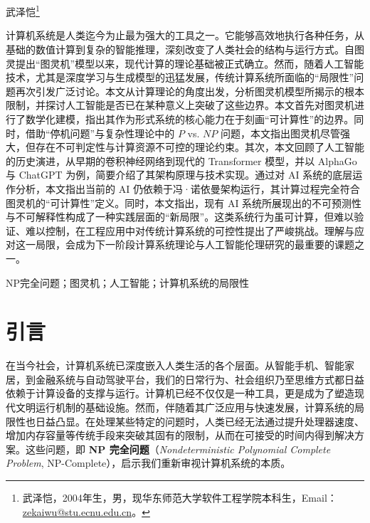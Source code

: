 \documentclass[UTF8,openany,zihao=5]{ctexbook}
\begin{document}
\setcounter{page}{1}

\begin{center}
  ~\\[1em]
  {
  \heiti{}\\
  \vspace{0.8em}
  \kaishu{}武泽恺\footnote{武泽恺，2004年生，男，现华东师范大学软件工程学院本科生，Email：\url{zekaiwu@stu.ecnu.edu.cn}。}\\
  \vspace{0.2em}
  \songti{}
  }
\end{center}

\pagestyle{plain}

\linespread{1.1}
{
  计算机系统是人类迄今为止最为强大的工具之一。它能够高效地执行各种任务，从基础的数值计算到复杂的智能推理，深刻改变了人类社会的结构与运行方式。自图灵提出“图灵机”模型以来，现代计算的理论基础被正式确立。然而，随着人工智能技术，尤其是深度学习与生成模型的迅猛发展，传统计算系统所面临的“局限性”问题再次引发广泛讨论。本文从计算理论的角度出发，分析图灵机模型所揭示的根本限制，并探讨人工智能是否已在某种意义上突破了这些边界。本文首先对图灵机进行了数学化建模，指出其作为形式系统的核心能力在于刻画“可计算性”的边界。同时，借助“停机问题”与复杂性理论中的 $P$ vs. $NP$ 问题，本文指出图灵机尽管强大，但存在不可判定性与计算资源不可控的理论约束。其次，本文回顾了人工智能的历史演进，从早期的卷积神经网络到现代的 Transformer 模型，并以 AlphaGo 与 ChatGPT 为例，简要介绍了其架构原理与技术实现。通过对 AI 系统的底层运作分析，本文指出当前的 AI 仍依赖于冯·诺依曼架构运行，其计算过程完全符合图灵机的“可计算性”定义。同时，本文指出，现有 AI 系统所展现出的不可预测性与不可解释性构成了一种实践层面的“新局限”。这类系统行为虽可计算，但难以验证、难以控制，在工程应用中对传统计算系统的可控性提出了严峻挑战。理解与应对这一局限，会成为下一阶段计算系统理论与人工智能伦理研究的最重要的课题之一。

  NP完全问题；图灵机；人工智能；计算机系统的局限性
}
\linespread{1.25}

\songti{}
\chapter{引言}

在当今社会，计算机系统已深度嵌入人类生活的各个层面。从智能手机、智能家居，到金融系统与自动驾驶平台，我们的日常行为、社会组织乃至思维方式都日益依赖于计算设备的支撑与运行。计算机已经不仅仅是一种工具，更是成为了塑造现代文明运行机制的基础设施。然而，伴随着其广泛应用与快速发展，计算系统的局限性也日益凸显。在处理某些特定的问题时，人类已经无法通过提升处理器速度、增加内存容量等传统手段来突破其固有的限制，从而在可接受的时间内得到解决方案。这些问题，即 \textbf{NP 完全问题}（\textit{Nondeterministic Polynomial Complete Problem}\cite{Cook1971}, NP-Complete），启示我们重新审视计算机系统的本质。
\end{document}
